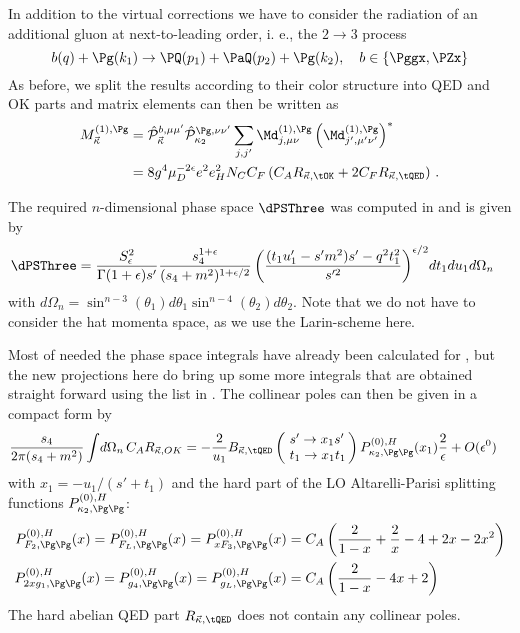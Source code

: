 In addition to the virtual corrections we have to consider the radiation of an additional gluon at next-to-leading order, i. e., the $2\to 3$ process
\begin{equation}
b(q) + \Pg(k_1) \rightarrow \PQ(p_1)+\PaQ(p_2) + \Pg(k_2),\quad b\in\{\Pggx,\PZx\}
\end{equation}
As before, we split the results according to their color structure into QED and OK parts and matrix elements can then be written as
\begin{align}
M_{\vec \kappa}^{(1),\Pg} &= \hat {\mathcal P}_{\vec \kappa}^{b,\mu\mu'}\hat {\mathcal P}_{\kappa_2}^{\Pg,\nu\nu'}\sum_{j,j'}\Md^{(1),\Pg}_{j,\mu\nu}\left(\Md^{(1),\Pg}_{j',\mu'\nu'}\right)^*\\
 &= 8g^4\mu_D^{-2\epsilon}e^2e_H^2 N_C C_F\left( C_A R_{\vec \kappa,\tOK} + 2C_F R_{\vec \kappa,\tQED}\right)\,.
\end{align}

The required $n$-dimensional phase space $\dPSThree$ was computed in \cite{Hekhorn:2018ywm} and is given by
\begin{align}
\dPSThree &= \frac{S_\epsilon^2}{\Gamma(1+\epsilon)s'} \frac{s_4^{1+\epsilon}}{(s_4+m^2)^{1+\epsilon/2}}\left(\frac{(t_1u_1'-s'm^2)s' - q^2t_1^2}{s'^2}\right)^{\epsilon/2}\! dt_1 du_1 d\Omega_n
\end{align}
with $d\Omega_n = \sin^{n-3}(\theta_1)d\theta_1\sin^{n-4}(\theta_2)d\theta_2$. Note that we do not have to consider the hat momenta space, as we use the Larin-scheme here.

Most of needed the phase space integrals have already been calculated for \cite{Hekhorn:2018ywm}, but the new projections here do bring up some more integrals that are obtained straight forward using the list in \cite{Bojak:2000eu}. The collinear poles can then be given in a compact form by
\begin{align}
\frac{s_4}{2\pi(s_4+m^2)}\int\!d\Omega_n \,C_A R_{\vec \kappa,OK} &=-\frac 2 {u_1}B_{\vec \kappa,\tQED}\left(\!\begin{array}{l}s'\rightarrow x_1s'\\t_1\rightarrow x_1 t_1\end{array}\!\!\right) P^{(0),H}_{\kappa_2,\Pg\Pg}(x_1)\frac 2 \epsilon + O(\epsilon^0) \label{eq:ROKPoles}
\end{align}
with $x_1 = -u_1/(s'+t_1)$ and the hard part of the LO Altarelli-Parisi splitting functions $P^{(0),H}_{\kappa_2,\Pg\Pg}$\cite{Altarelli:1977zs}:
\begin{align}
P^{(0),H}_{F_2,\Pg\Pg}(x) = P^{(0),H}_{F_L,\Pg\Pg}(x) = P^{(0),H}_{xF_3,\Pg\Pg}(x) &= C_A\left(\frac 2 {1-x} + \frac 2 x - 4 + 2x - 2x^2\right) \label{eq:PFggH}\\
P^{(0),H}_{2xg_1,\Pg\Pg}(x) = P^{(0),H}_{g_4,\Pg\Pg}(x) = P^{(0),H}_{g_L,\Pg\Pg}(x) &= C_A\left(\frac 2 {1-x} - 4x + 2\right) \label{eq:PgggH}
\end{align}
The hard abelian QED part $R_{\vec \kappa,\tQED}$ does not contain any collinear poles.

